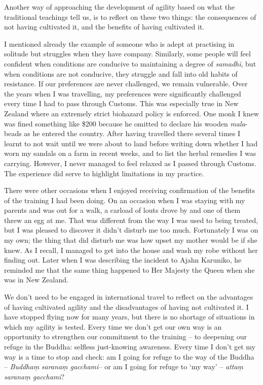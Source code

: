 Another way of approaching the development of agility based on what the
traditional teachings tell us, is to reflect on these two things: the
consequences of not having cultivated it, and the benefits of having
cultivated it.

I mentioned already the example of someone who is adept at practising in
solitude but struggles when they have company. Similarly, some people
will feel confident when conditions are conducive to maintaining a
degree of \emph{samadhi}, but when conditions are not conducive, they
struggle and fall into old habits of resistance. If our preferences are
never challenged, we remain vulnerable. Over the years when I was
travelling, my preferences were significantly challenged every time I
had to pass through Customs. This was especially true in New Zealand
where an extremely strict biohazard policy is enforced. One monk I knew
was fined something like \$200 because he omitted to declare his wooden
\emph{mala}-beads as he entered the country. After having travelled
there several times I learnt to not wait until we were about to land
before writing down whether I had worn my sandals on a farm in recent
weeks, and to list the herbal remedies I was carrying. However, I never
managed to feel relaxed as I passed through Customs. The experience did
serve to highlight limitations in my practice.

There were other occasions when I enjoyed receiving confirmation of the
benefits of the training I had been doing. On an occasion when I was
staying with my parents and was out for a walk, a carload of louts drove
by and one of them threw an egg at me. That was different from the way I
was used to being treated, but I was pleased to discover it didn't
disturb me too much. Fortunately I was on my own; the thing that did
disturb me was how upset my mother would be if she knew. As I recall, I
managed to get into the house and wash my robe without her finding out.
Later when I was describing the incident to Ajahn Karuniko, he reminded
me that the same thing happened to Her Majesty the Queen when she was in
New Zealand.

\enlargethispage{\baselineskip}

We don't need to be engaged in international travel to reflect on the
advantages of having cultivated agility and the disadvantages of having
not cultivated it. I have stopped flying now for many years, but there
is no shortage of situations in which my agility is tested. Every time
we don't get our own way is an opportunity to strengthen our commitment
to the training -- to deepening our refuge in the Buddha: selfless
just-knowing awareness. Every time I don't get my way is a time to stop
and check: am I going for refuge to the way of the Buddha --
\emph{Buddhaṃ} \emph{saranaṃ gacchami--} or am I going for refuge to `my
way' -- \emph{attaṃ saranaṃ gacchami}?

